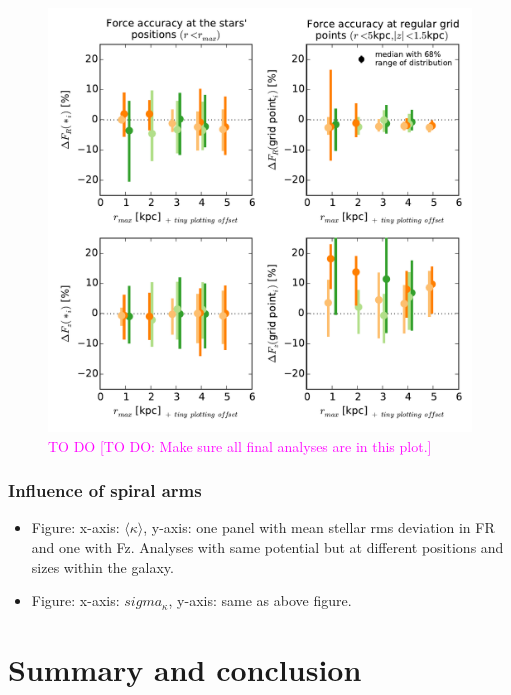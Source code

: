 \documentclass[iop,revtex4,numberedappendix,appendixfloats]{emulateapj}
\newcommand{\Wilma}[1]{\textcolor{Magenta}{#1}}
\begin{document}
\begin{figure}[!htbp]
\includegraphics[width=\columnwidth]{fig/MNdHHdiffSph2_bias_in_forces_recovery.pdf}
\caption{\Wilma{TO DO} \Wilma{[TO DO: Make sure all final analyses are in this plot.]}}
\label{fig:???}
\end{figure}



\subsubsection{Influence of spiral arms}

\begin{itemize}
\item Figure: x-axis: $\langle \kappa \rangle$, y-axis: one panel with mean stellar rms deviation in FR and one with Fz. Analyses with same potential but at different positions and sizes within the galaxy.
\item Figure: x-axis: $sigma_\kappa$, y-axis: same as above figure.
\end{itemize}

\section{Summary and conclusion}

{}

\end{document}

